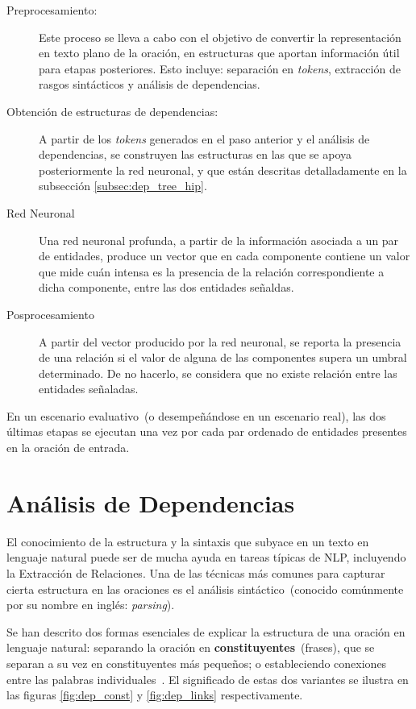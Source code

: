 \begin{description}
	
	\item[Preprocesamiento:] Este proceso se lleva a cabo con el objetivo de convertir la representación en texto plano de la oración, en estructuras que aportan información útil para etapas posteriores.
	Esto incluye: separación en \textit{tokens}, extracción de rasgos sintácticos y análisis de dependencias.
	
	\item[Obtención de estructuras de dependencias:] A partir de los \textit{tokens} generados en el paso anterior y el análisis de dependencias, se construyen las estructuras en las que se apoya posteriormente la red neuronal, y que están descritas detalladamente en la subsección \ref{subsec:dep_tree_hip}.
	
	\item[Red Neuronal] Una red neuronal profunda, a partir de la información asociada a un par de entidades, produce un vector que en cada componente contiene un valor que mide cuán intensa es la presencia de la relación correspondiente a dicha componente, entre las dos entidades señaldas.
	
	\item[Posprocesamiento] A partir del vector producido por la red neuronal, se reporta la presencia de una relación si el valor de alguna de las componentes supera un umbral determinado.
	De no hacerlo, se considera que no existe relación entre las entidades señaladas.
	
\end{description}

En un escenario evaluativo~(o desempeñándose en un escenario real), las dos últimas etapas se ejecutan una vez por cada par ordenado de entidades presentes en la oración de entrada.


\section{Análisis de Dependencias}\label{sec:parsing}

El conocimiento de la estructura y la sintaxis que subyace en un texto en lenguaje natural puede ser de mucha ayuda en tareas típicas de NLP, incluyendo la Extracción de Relaciones.
Una de las técnicas más comunes para capturar cierta estructura en las oraciones es el análisis sintáctico~(conocido comúnmente por su nombre en inglés: \emph{parsing}).

Se han descrito dos formas esenciales de explicar la estructura de una oración en lenguaje natural: separando la oración en \textbf{constituyentes}~(frases), que se separan a su vez en constituyentes más pequeños; o estableciendo conexiones entre las palabras individuales~\cite{covington2001fundamental}.
El significado de estas dos variantes se ilustra en las figuras \ref{fig:dep_const} y \ref{fig:dep_links} respectivamente.

